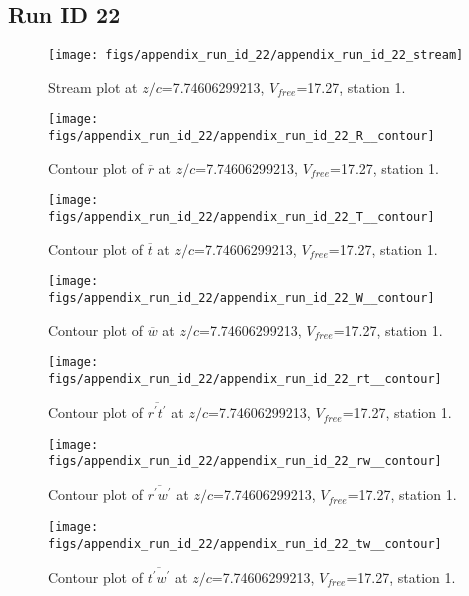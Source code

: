 \subsection{Run ID 22}
\begin{figure}[H]
\centering
\texttt{[image: figs/appendix\_run\_id\_22/appendix\_run\_id\_22\_stream]}
\caption{Stream plot at $z/c$=7.74606299213, $V_{free}$=17.27, station 1.}
\label{fig:appendix_run_id_22_stream}
\end{figure}


\begin{figure}[H]
\centering
\texttt{[image: figs/appendix\_run\_id\_22/appendix\_run\_id\_22\_R\_\_contour]}
\caption{Contour plot of $\overline{r}$ at $z/c$=7.74606299213, $V_{free}$=17.27, station 1.}
\label{fig:appendix_run_id_22_R__contour}
\end{figure}


\begin{figure}[H]
\centering
\texttt{[image: figs/appendix\_run\_id\_22/appendix\_run\_id\_22\_T\_\_contour]}
\caption{Contour plot of $\overline{t}$ at $z/c$=7.74606299213, $V_{free}$=17.27, station 1.}
\label{fig:appendix_run_id_22_T__contour}
\end{figure}


\begin{figure}[H]
\centering
\texttt{[image: figs/appendix\_run\_id\_22/appendix\_run\_id\_22\_W\_\_contour]}
\caption{Contour plot of $\overline{w}$ at $z/c$=7.74606299213, $V_{free}$=17.27, station 1.}
\label{fig:appendix_run_id_22_W__contour}
\end{figure}


\begin{figure}[H]
\centering
\texttt{[image: figs/appendix\_run\_id\_22/appendix\_run\_id\_22\_rt\_\_contour]}
\caption{Contour plot of $\overline{r^\prime t^\prime}$ at $z/c$=7.74606299213, $V_{free}$=17.27, station 1.}
\label{fig:appendix_run_id_22_rt__contour}
\end{figure}


\begin{figure}[H]
\centering
\texttt{[image: figs/appendix\_run\_id\_22/appendix\_run\_id\_22\_rw\_\_contour]}
\caption{Contour plot of $\overline{r^\prime w^\prime}$ at $z/c$=7.74606299213, $V_{free}$=17.27, station 1.}
\label{fig:appendix_run_id_22_rw__contour}
\end{figure}


\begin{figure}[H]
\centering
\texttt{[image: figs/appendix\_run\_id\_22/appendix\_run\_id\_22\_tw\_\_contour]}
\caption{Contour plot of $\overline{t^\prime w^\prime}$ at $z/c$=7.74606299213, $V_{free}$=17.27, station 1.}
\label{fig:appendix_run_id_22_tw__contour}
\end{figure}


